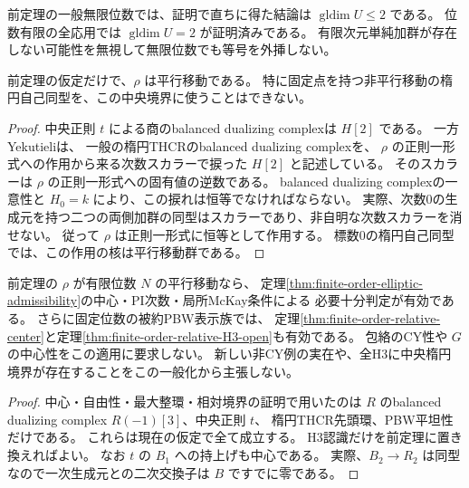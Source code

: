 \begin{remark}[大域次元の等号の範囲]
前定理の一般無限位数では、証明で直ちに得た結論は $\operatorname{gldim}U\le2$ である。
位数有限の全応用では $\operatorname{gldim}U=2$ が証明済みである。
有限次元単純加群が存在しない可能性を無視して無限位数でも等号を外挿しない。
\end{remark}

\begin{proposition}[中央楕円境界の自己同型は平行移動]
\label{prop:central-elliptic-boundary-translation}
前定理の仮定だけで、$\rho$ は平行移動である。
特に固定点を持つ非平行移動の楕円自己同型を、この中央境界に使うことはできない。
\end{proposition}
\begin{proof}
中央正則 $t$ による商のbalanced dualizing complexは $H[2]$ である。
一方 Yekutieli\cite[Theorem 7.3, Example 7.16]{YeTHCR}は、
一般の楕円THCRのbalanced dualizing complexを、
$\rho$ の正則一形式への作用から来る次数スカラーで捩った $H[2]$ と記述している。
そのスカラーは $\rho$ の正則一形式への固有値の逆数である。
balanced dualizing complexの一意性と $H_0=k$ により、この捩れは恒等でなければならない。
実際、次数0の生成元を持つ二つの両側加群の同型はスカラーであり、非自明な次数スカラーを消せない。
従って $\rho$ は正則一形式に恒等として作用する。
標数0の楕円自己同型では、この作用の核は平行移動群である。
\end{proof}

\begin{corollary}
\label{cor:normal-cubic-finite-order-admissibility}
前定理の $\rho$ が有限位数 $N$ の平行移動なら、
定理\ref{thm:finite-order-elliptic-admissibility}の中心・PI次数・局所McKay条件による
必要十分判定が有効である。
さらに固定位数の被約PBW表示族では、
定理\ref{thm:finite-order-relative-center}と定理\ref{thm:finite-order-relative-H3-open}も有効である。
包絡のCY性や $G$ の中心性をこの適用に要求しない。
新しい非CY例の実在や、全H3に中央楕円境界が存在することをこの一般化から主張しない。
\end{corollary}
\begin{proof}
中心・自由性・最大整環・相対境界の証明で用いたのは
$R$ のbalanced dualizing complex $R(-1)[3]$、中央正則 $t$、
楕円THCR先頭環、PBW平坦性だけである。
これらは現在の仮定で全て成立する。
H3認識だけを前定理に置き換えればよい。
なお $t$ の $B_1$ への持上げも中心である。
実際、$B_2\to R_2$ は同型なので一次生成元との二次交換子は $B$ ですでに零である。
\end{proof}

